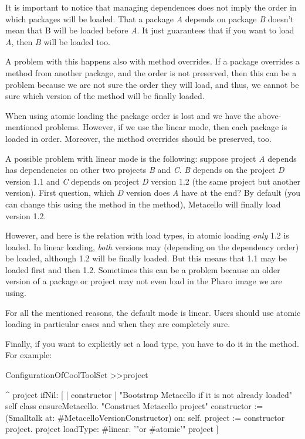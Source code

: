 \documentclass[a4paper,10pt,twoside]{book}
\begin{document}
\begin{code}{}
\begin{code}{}
It is important to notice that managing dependences does not imply the order in which packages will be loaded. That a package \emph{A} depends on package \emph{B} doesn't mean that B will be loaded before \emph{A}. It just guarantees that if you want to load \emph{A}, then \emph{B} will be loaded too. 

A problem with this happens also with method overrides. If a package overrides a method from another package, and the order is not preserved, then this can be a problem because we are not sure the order they will load, and thus, we cannot be sure which version of the method will be finally loaded. 

When using atomic loading the package order is lost and we have the above-mentioned problems. However, if we use the linear mode, then each package is loaded in order. Moreover, the method overrides should be preserved, too. 

A possible problem with linear mode is the following: suppose project \emph{A} depends has dependencies on other two projects \emph{B} and \emph{C}. \emph{B} depends on the project \emph{D} version 1.1 and \emph{C} depends on project \emph{D} version 1.2 (the same project but another version). First question, which \emph{D} version does \emph{A} have at the end?  By default (you can change this using the method  in the  method), Metacello will finally load version 1.2.

However, and here is the relation with load types, in atomic loading \emph{only} 1.2 is loaded. In linear loading, \emph{both} versions may (depending on the dependency order) be loaded, although 1.2 will be finally loaded. But this means that 1.1 may be loaded first and then 1.2. Sometimes this can be a problem because an older version of a package or project may not even load in the Pharo image we are using. 

For all the mentioned reasons, the default mode is linear. Users should use atomic loading in particular cases and when they are completely sure. 

Finally, if you want to explicitly set a load type, you have to do it in the  method. For example:

\begin{code}{}
ConfigurationOfCoolToolSet >>project

	^ project ifNil: [ | constructor |
		"Bootstrap Metacello if it is not already loaded"
		self class ensureMetacello.
		"Construct Metacello project"
		constructor := (Smalltalk at: #MetacelloVersionConstructor) on: self.
		project := constructor project.
		project loadType: #linear. '"or #atomic'"
		project ]


\end{code}
\end{code}
\end{code}
\end{document}
